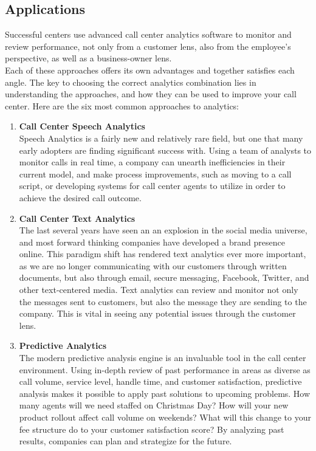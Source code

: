 \subsection{Applications}

 

	 Successful centers use advanced call center analytics software to monitor and review performance, not only from a customer lens, also from the employee’s perspective, as well as a business-owner lens.\\
	
	Each of these approaches offers its own advantages and together satisfies each angle. The key to choosing the correct analytics combination lies in understanding the approaches, and how they can be used to improve your call center. Here are the six most common approaches to analytics:\\
	\begin{enumerate}
\item	\textbf{Call Center Speech Analytics}\\ Speech Analytics is a fairly new and relatively rare field, but one that many early adopters are finding significant success with. Using a team of analysts to monitor calls in real time, a company can unearth inefficiencies in their current model, and make process improvements, such as moving to a call script, or developing systems for call center agents to utilize in order to achieve the desired call outcome.
\item	\textbf{Call Center Text Analytics}\\ The last several years have seen an an explosion in the social media universe, and most forward thinking companies have developed a brand presence online. This paradigm shift has rendered text analytics ever more important, as we are no longer communicating with our customers through written documents, but also through email, secure messaging, Facebook, Twitter, and other text-centered media. Text analytics can review and monitor not only the messages sent to customers, but also the message they are sending to the company. This is vital in seeing any potential issues through the customer lens.
\item 	\textbf{Predictive Analytics}\\ The modern predictive analysis engine is an invaluable tool in the call center environment. Using in-depth review of past performance in areas as diverse as call volume, service level, handle time, and customer satisfaction, predictive analysis makes it possible to apply past solutions to upcoming problems. How many agents will we need staffed on Christmas Day? How will your new product rollout affect call volume on weekends? What will this change to your fee structure do to your customer satisfaction score? By analyzing past results, companies can plan and strategize for the future.
	
\end{enumerate}
\newpage
